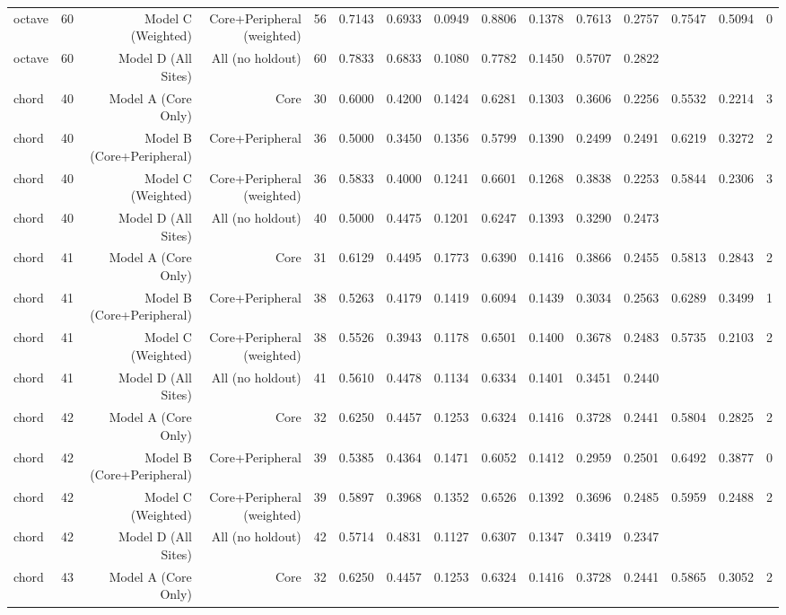 {\begin{longtable}{lrrrrrrrrrrrrrr}
  octave & 60 & Model C (Weighted) & Core+Peripheral (weighted) & 56 & 0.7143 & 0.6933 & 0.0949 & 0.8806 & 0.1378 & 0.7613 & 0.2757 & 0.7547 & 0.5094 & 0 \\
  octave & 60 & Model D (All Sites) & All (no holdout) & 60 & 0.7833 & 0.6833 & 0.1080 & 0.7782 & 0.1450 & 0.5707 & 0.2822 &  &  &  \\
  chord & 40 & Model A (Core Only) & Core & 30 & 0.6000 & 0.4200 & 0.1424 & 0.6281 & 0.1303 & 0.3606 & 0.2256 & 0.5532 & 0.2214 & 3 \\
  chord & 40 & Model B (Core+Peripheral) & Core+Peripheral & 36 & 0.5000 & 0.3450 & 0.1356 & 0.5799 & 0.1390 & 0.2499 & 0.2491 & 0.6219 & 0.3272 & 2 \\
  chord & 40 & Model C (Weighted) & Core+Peripheral (weighted) & 36 & 0.5833 & 0.4000 & 0.1241 & 0.6601 & 0.1268 & 0.3838 & 0.2253 & 0.5844 & 0.2306 & 3 \\
  chord & 40 & Model D (All Sites) & All (no holdout) & 40 & 0.5000 & 0.4475 & 0.1201 & 0.6247 & 0.1393 & 0.3290 & 0.2473 &  &  &  \\
  chord & 41 & Model A (Core Only) & Core & 31 & 0.6129 & 0.4495 & 0.1773 & 0.6390 & 0.1416 & 0.3866 & 0.2455 & 0.5813 & 0.2843 & 2 \\
  chord & 41 & Model B (Core+Peripheral) & Core+Peripheral & 38 & 0.5263 & 0.4179 & 0.1419 & 0.6094 & 0.1439 & 0.3034 & 0.2563 & 0.6289 & 0.3499 & 1 \\
  chord & 41 & Model C (Weighted) & Core+Peripheral (weighted) & 38 & 0.5526 & 0.3943 & 0.1178 & 0.6501 & 0.1400 & 0.3678 & 0.2483 & 0.5735 & 0.2103 & 2 \\
  chord & 41 & Model D (All Sites) & All (no holdout) & 41 & 0.5610 & 0.4478 & 0.1134 & 0.6334 & 0.1401 & 0.3451 & 0.2440 &  &  &  \\
  chord & 42 & Model A (Core Only) & Core & 32 & 0.6250 & 0.4457 & 0.1253 & 0.6324 & 0.1416 & 0.3728 & 0.2441 & 0.5804 & 0.2825 & 2 \\
  chord & 42 & Model B (Core+Peripheral) & Core+Peripheral & 39 & 0.5385 & 0.4364 & 0.1471 & 0.6052 & 0.1412 & 0.2959 & 0.2501 & 0.6492 & 0.3877 & 0 \\
  chord & 42 & Model C (Weighted) & Core+Peripheral (weighted) & 39 & 0.5897 & 0.3968 & 0.1352 & 0.6526 & 0.1392 & 0.3696 & 0.2485 & 0.5959 & 0.2488 & 2 \\
  chord & 42 & Model D (All Sites) & All (no holdout) & 42 & 0.5714 & 0.4831 & 0.1127 & 0.6307 & 0.1347 & 0.3419 & 0.2347 &  &  &  \\
  chord & 43 & Model A (Core Only) & Core & 32 & 0.6250 & 0.4457 & 0.1253 & 0.6324 & 0.1416 & 0.3728 & 0.2441 & 0.5865 & 0.3052 & 2 \\

\end{longtable}}
